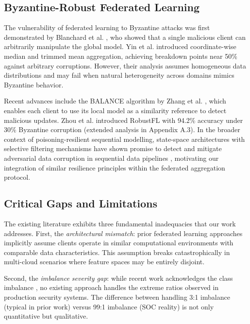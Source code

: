 \documentclass[12pt,a4paper]{article}
\theoremstyle{definition}
\begin{document}
\subsection{Byzantine-Robust Federated Learning}

The vulnerability of federated learning to Byzantine attacks was first demonstrated by Blanchard et al. \cite{blanchard2017machine}, who showed that a single malicious client can arbitrarily manipulate the global model. Yin et al. \cite{yin2018byzantine} introduced coordinate-wise median and trimmed mean aggregation, achieving breakdown points near 50\% against arbitrary corruptions. However, their analysis assumes homogeneous data distributions and may fail when natural heterogeneity across domains mimics Byzantine behavior.

Recent advances include the BALANCE algorithm by Zhang et al. \cite{zhang2024balance}, which enables each client to use its local model as a similarity reference to detect malicious updates. Zhou et al. \cite{zhou2024robust} introduced RobustFL with 94.2\% accuracy under 30\% Byzantine corruption (extended analysis in Appendix A.3). In the broader context of poisoning-resilient sequential modelling, state-space architectures with selective filtering mechanisms have shown promise to detect and mitigate adversarial data corruption in sequential data pipelines \cite{anaedevha2026mambashield}, motivating our integration of similar resilience principles within the federated aggregation protocol.

\subsection{Critical Gaps and Limitations}

The existing literature exhibits three fundamental inadequacies that our work addresses. First, the \textit{architectural mismatch}: prior federated learning approaches \cite{mcmahan2017communication,li2020federated} implicitly assume clients operate in similar computational environments with comparable data characteristics. This assumption breaks catastrophically in multi-cloud scenarios where feature spaces may be entirely disjoint.

Second, the \textit{imbalance severity gap}: while recent work acknowledges the class imbalance \cite{zhou2024robust,zhang2024privacy}, no existing approach handles the extreme ratios observed in production security systems. The difference between handling 3:1 imbalance (typical in prior work) versus 99:1 imbalance (SOC reality) is not only quantitative but qualitative.
\end{document}
